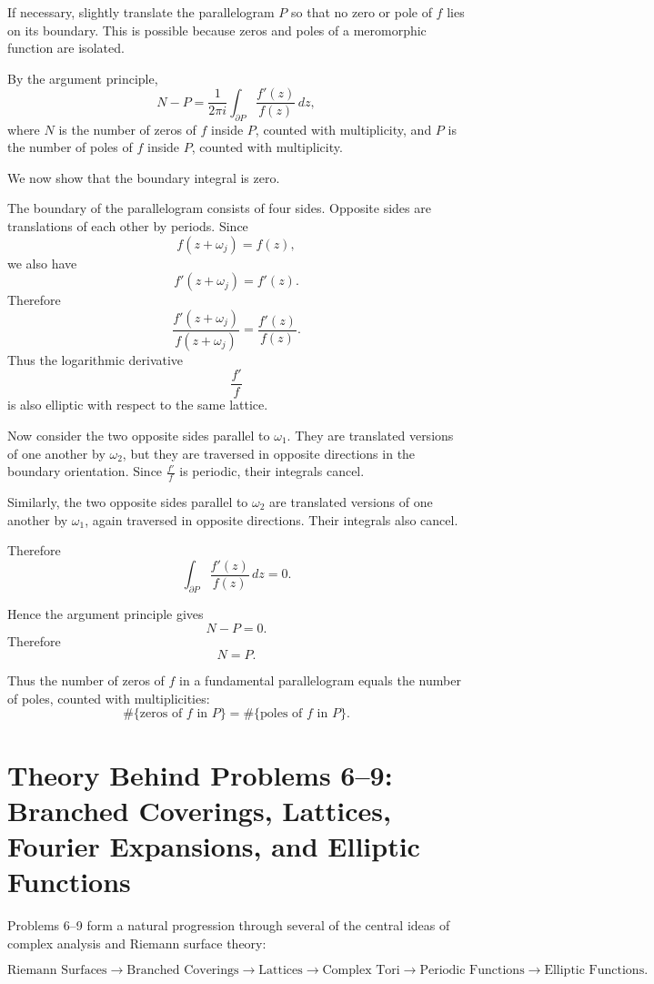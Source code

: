 \documentclass[12pt,a4paper]{article}
\theoremstyle{notespace}
\begin{document}
If necessary, slightly translate the parallelogram \(P\) so that no zero or
pole of \(f\) lies on its boundary. This is possible because zeros and poles
of a meromorphic function are isolated.

By the argument principle,
\[
N-P
=
\frac{1}{2\pi i}\int_{\partial P}\frac{f'(z)}{f(z)}\,dz,
\]
where \(N\) is the number of zeros of \(f\) inside \(P\), counted with
multiplicity, and \(P\) is the number of poles of \(f\) inside \(P\), counted
with multiplicity.

We now show that the boundary integral is zero.

The boundary of the parallelogram consists of four sides. Opposite sides are
translations of each other by periods. Since
\[
f(z+\omega_j)=f(z),
\]
we also have
\[
f'(z+\omega_j)=f'(z).
\]
Therefore
\[
\frac{f'(z+\omega_j)}{f(z+\omega_j)}
=
\frac{f'(z)}{f(z)}.
\]
Thus the logarithmic derivative
\[
\frac{f'}{f}
\]
is also elliptic with respect to the same lattice.

Now consider the two opposite sides parallel to \(\omega_1\). They are
translated versions of one another by \(\omega_2\), but they are traversed in
opposite directions in the boundary orientation. Since \(\frac{f'}{f}\) is
periodic, their integrals cancel.

Similarly, the two opposite sides parallel to \(\omega_2\) are translated
versions of one another by \(\omega_1\), again traversed in opposite
directions. Their integrals also cancel.

Therefore
\[
\int_{\partial P}\frac{f'(z)}{f(z)}\,dz=0.
\]

Hence the argument principle gives
\[
N-P=0.
\]
Therefore
\[
N=P.
\]

Thus the number of zeros of \(f\) in a fundamental parallelogram equals the
number of poles, counted with multiplicities:
\[
\boxed{
	\#\{\text{zeros of }f\text{ in }P\}
	=
	\#\{\text{poles of }f\text{ in }P\}.
}
\]
	
\section{Theory Behind Problems 6--9: Branched Coverings, Lattices, Fourier Expansions, and Elliptic Functions}

Problems 6--9 form a natural progression through several of the central ideas of complex analysis and Riemann surface theory:

\[
\text{Riemann Surfaces}
\longrightarrow
\text{Branched Coverings}
\longrightarrow
\text{Lattices}
\longrightarrow
\text{Complex Tori}
\longrightarrow
\text{Periodic Functions}
\longrightarrow
\text{Elliptic Functions}.
\]
\end{document}
